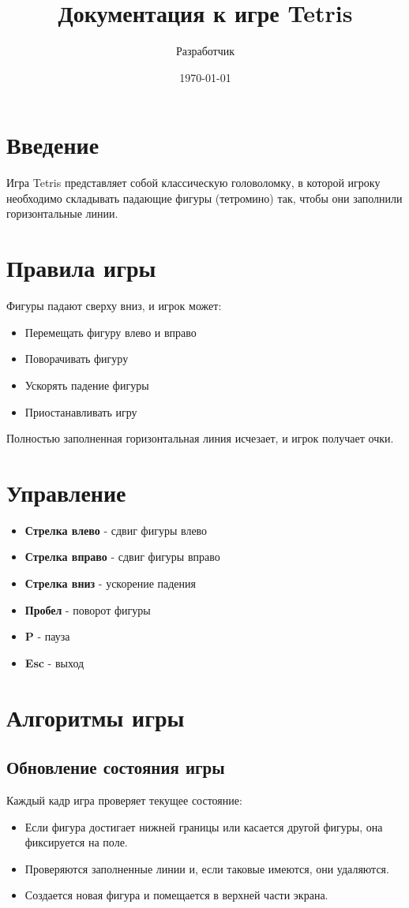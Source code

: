 \documentclass[a4paper,12pt]{article}
\title{Документация к игре Tetris}
\author{Разработчик}
\date{\today}
\begin{document}
\maketitle

\section{Введение}
Игра Tetris представляет собой классическую головоломку, в которой игроку необходимо складывать падающие фигуры (тетромино) так, чтобы они заполнили горизонтальные линии.

\section{Правила игры}
Фигуры падают сверху вниз, и игрок может:
\begin{itemize}
    \item Перемещать фигуру влево и вправо
    \item Поворачивать фигуру
    \item Ускорять падение фигуры
    \item Приостанавливать игру
\end{itemize}

Полностью заполненная горизонтальная линия исчезает, и игрок получает очки.

\section{Управление}
\begin{itemize}
    \item \textbf{Стрелка влево} - сдвиг фигуры влево
    \item \textbf{Стрелка вправо} - сдвиг фигуры вправо
    \item \textbf{Стрелка вниз} - ускорение падения
    \item \textbf{Пробел} - поворот фигуры
    \item \textbf{P} - пауза
    \item \textbf{Esc} - выход
\end{itemize}

\section{Алгоритмы игры}
\subsection{Обновление состояния игры}
Каждый кадр игра проверяет текущее состояние:
\begin{itemize}
    \item Если фигура достигает нижней границы или касается другой фигуры, она фиксируется на поле.
    \item Проверяются заполненные линии и, если таковые имеются, они удаляются.
    \item Создается новая фигура и помещается в верхней части экрана.
\end{itemize}
\end{document}
